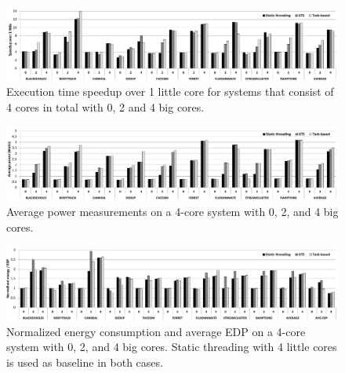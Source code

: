 \begin{figure}[t]%
	\centering
	\includegraphics[width=1.0\textwidth]{figures/speedup-4.pdf}
	\vspace{-0.5cm}
	\caption{Execution time speedup over 1 little core for systems that consist of 4 cores in total with 0, 2 and 4 big cores.}
	\label{fig:speedup4}%
	\vspace{-0.3cm}
\end{figure}

\begin{figure}[t]%
	\centering
	\includegraphics[width=1.0\textwidth]{figures/power4.pdf}
	\vspace{-0.5cm}
	\caption{Average power measurements on a 4-core system with 0, 2, and 4 big cores.}
	\label{fig:power4}%
	\vspace{-0.3cm}
\end{figure}

\begin{figure}[t]%
	\centering
	\includegraphics[width=1.0\textwidth]{figures/energy_EDP-4.pdf}
	\vspace{-0.5cm}
	\caption{Normalized energy consumption and average EDP on a 4-core system with 0, 2, and 4 big cores. Static threading with 4 little cores is used as baseline in both cases. }
	\label{fig:energy4}%
	\vspace{-0.3cm}
\end{figure}

